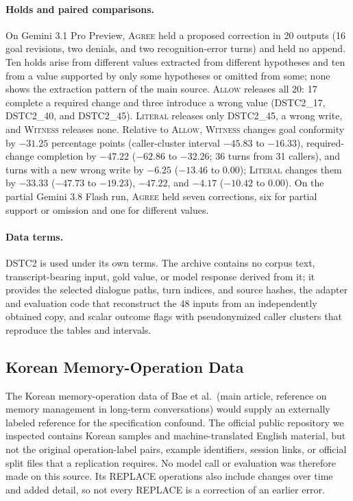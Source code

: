 \documentclass[acmsmall,review]{acmart}
\newcommand{\agree}{\textsc{Agree}}
\newcommand{\allow}{\textsc{Allow}}
\newcommand{\literal}{\textsc{Literal}}
\newcommand{\witness}{\textsc{Witness}}
\begin{document}
\paragraph{Holds and paired comparisons.} On Gemini 3.1 Pro Preview, \agree{} held a proposed correction in 20 outputs (16 goal revisions, two denials, and two recognition-error turns) and held no append. Ten holds arise from different values extracted from different hypotheses and ten from a value supported by only some hypotheses or omitted from some; none shows the extraction pattern of the main source. \allow{} releases all 20: 17 complete a required change and three introduce a wrong value (DSTC2\_17, DSTC2\_40, and DSTC2\_45). \literal{} releases only DSTC2\_45, a wrong write, and \witness{} releases none. Relative to \allow{}, \witness{} changes goal conformity by $-31.25$ percentage points (caller-cluster interval $-45.83$ to $-16.33$), required-change completion by $-47.22$ ($-62.86$ to $-32.26$; 36 turns from 31 callers), and turns with a new wrong write by $-6.25$ ($-13.46$ to 0.00); \literal{} changes them by $-33.33$ ($-47.73$ to $-19.23$), $-47.22$, and $-4.17$ ($-10.42$ to 0.00). On the partial Gemini 3.8 Flash run, \agree{} held seven corrections, six for partial support or omission and one for different values.

\paragraph{Data terms.} DSTC2 is used under its own terms. The archive contains no corpus text, transcript-bearing input, gold value, or model response derived from it; it provides the selected dialogue paths, turn indices, and source hashes, the adapter and evaluation code that reconstruct the 48 inputs from an independently obtained copy, and scalar outcome flags with pseudonymized caller clusters that reproduce the tables and intervals.

\subsection{Korean Memory-Operation Data}
The Korean memory-operation data of Bae et al.\ (main article, reference on memory management in long-term conversations) would supply an externally labeled reference for the specification confound. The official public repository we inspected contains Korean samples and machine-translated English material, but not the original operation-label pairs, example identifiers, session links, or official split files that a replication requires. No model call or evaluation was therefore made on this source. Its REPLACE operations also include changes over time and added detail, so not every REPLACE is a correction of an earlier error.
\FloatBarrier
\setcounter{figure}{0}\setcounter{table}{0}
\renewcommand{\thefigure}{K\arabic{figure}}
\renewcommand{\thetable}{K\arabic{table}}
\end{document}
